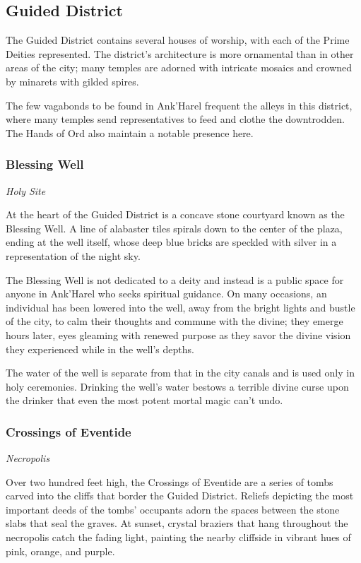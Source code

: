 \documentclass[letterpaper, 11pt, bg=full, twocolumn]{dndbook}
\begin{document}
\subsection{Guided District}

The Guided District contains several houses of worship, with each of the Prime Deities represented. The district's architecture is more ornamental than in other areas of the city; many temples are adorned with intricate mosaics and crowned by minarets with gilded spires.


The few vagabonds to be found in Ank'Harel frequent the alleys in this district, where many temples send representatives to feed and clothe the downtrodden. The Hands of Ord also maintain a notable presence here.

\subsubsection{Blessing Well}

\textit{Holy Site}

At the heart of the Guided District is a concave stone courtyard known as the Blessing Well. A line of alabaster tiles spirals down to the center of the plaza, ending at the well itself, whose deep blue bricks are speckled with silver in a representation of the night sky.

The Blessing Well is not dedicated to a deity and instead is a public space for anyone in Ank'Harel who seeks spiritual guidance. On many occasions, an individual has been lowered into the well, away from the bright lights and bustle of the city, to calm their thoughts and commune with the divine; they emerge hours later, eyes gleaming with renewed purpose as they savor the divine vision they experienced while in the well's depths.

The water of the well is separate from that in the city canals and is used only in holy ceremonies. Drinking the well's water bestows a terrible divine curse upon the drinker that even the most potent mortal magic can't undo.

\subsubsection{Crossings of Eventide}

\textit{Necropolis}

Over two hundred feet high, the Crossings of Eventide are a series of tombs carved into the cliffs that border the Guided District. Reliefs depicting the most important deeds of the tombs' occupants adorn the spaces between the stone slabs that seal the graves. At sunset, crystal braziers that hang throughout the necropolis catch the fading light, painting the nearby cliffside in vibrant hues of pink, orange, and purple.
\end{document}
